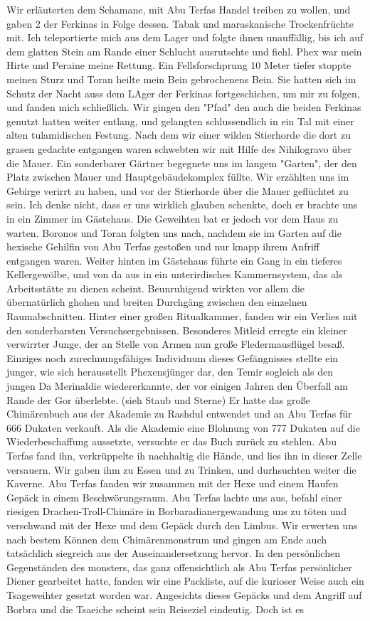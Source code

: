 Wir erläuterten dem Schamane, mit Abu Terfas Handel treiben zu wollen, und gaben 2 der Ferkinas in Folge dessen. Tabak und maraskanische Trockenfrüchte mit. Ich teleportierte mich aus dem Lager und folgte ihnen unauffällig, bis ich auf dem glatten Stein am Rande einer Schlucht ausrutschte und fiehl. Phex war mein Hirte und Peraine meine Rettung. Ein Fellsforschprung 10 Meter tiefer stoppte meinen Sturz und Toran heilte mein Bein gebrochenens Bein. Sie hatten sich im Schutz der Nacht auss dem LAger der Ferkinas fortgeschichen, um mir zu folgen, und fanden mich schließlich. Wir gingen den "Pfad" den auch die beiden Ferkinas genutzt hatten weiter entlang, und gelangten schlussendlich in ein Tal mit einer alten tulamidischen Festung. Nach dem wir einer wilden Stierhorde die dort zu grasen gedachte entgangen waren schwebten wir mit Hilfe des Nihilogravo über die Mauer. Ein sonderbarer Gärtner begegnete uns im langem "Garten", der den Platz zwischen Mauer und Hauptgebäudekomplex füllte. Wir erzählten uns im Gebirge verirrt zu haben, und vor der Stierhorde über die Mauer geflüchtet zu sein. Ich denke nicht, dass er uns wirklich glauben schenkte, doch er brachte uns in ein Zimmer im Gästehaus. Die Geweihten bat er jedoch vor dem Haus zu warten. Boronos und Toran folgten uns nach, nachdem sie im Garten auf die hexische Gehilfin von Abu Terfas gestoßen und nur knapp ihrem Anfriff entgangen waren. Weiter hinten im Gästehaus führte ein Gang in ein tieferes Kellergewölbe, und von da aus in ein unterirdisches Kammernsystem, das als Arbeitsstätte zu dienen scheint. Beunruhigend wirkten vor allem die übernatürlich ghohen und breiten Durchgäng zwischen den einzelnen Raumabschnitten. Hinter einer großen Ritualkammer, fanden wir ein Verlies mit den sonderbarsten Versuchsergebnissen. Besonderes Mitleid erregte ein kleiner verwirrter Junge, der an Stelle von Armen nun große Fledermausflügel besaß. Einziges noch zurechnungsfähiges Individuum dieses Gefängnisses stellte ein junger, wie sich herausstellt Phexensjünger dar, den Temir sogleich als den jungen Da Merinaldie wiedererkannte, der vor einigen Jahren den Überfall am Rande der Gor überlebte. (sieh Staub und Sterne) Er hatte das große Chimärenbuch aus der Akademie zu Rashdul entwendet und an Abu Terfas für 666 Dukaten verkauft. Als die Akademie eine Blohnung von 777 Dukaten auf die Wiederbeschaffung aussetzte, versuchte er das Buch zurück zu stehlen. Abu Terfas fand ihn, verkrüppelte ih nachhaltig die Hände, und lies ihn in dieser Zelle versauern. Wir gaben ihm zu Essen und zu Trinken, und durhsuchten weiter die Kaverne. Abu Terfas fanden wir zusammen mit der Hexe und einem Haufen Gepäck in einem Beschwörungsraum. Abu Terfas lachte uns aus, befahl einer riesigen Drachen-Troll-Chimäre in Borbaradianergewandung uns zu töten und verschwand mit der Hexe und dem Gepäck durch den Limbus. Wir erwerten uns nach bestem Können dem Chimärenmonstrum und gingen am Ende auch tatsächlich siegreich aus der Auseinandersetzung hervor. In den persönlichen Gegenständen des monsters, das ganz offensichtlich als Abu Terfas persönlicher Diener gearbeitet hatte, fanden wir eine Packliste, auf die kurioser Weise auch ein Tsageweihter gesetzt worden war. Angesichts dieses Gepäcks und dem Angriff auf Borbra und die Tsaeiche scheint sein Reiseziel eindeutig. Doch ist es 